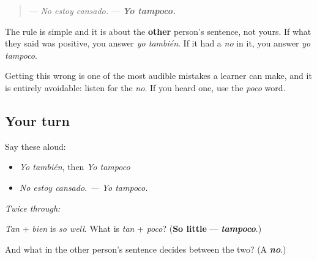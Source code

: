 \begin{culture}
\begin{quote}
— \emph{No estoy cansado.} — \emph{\textbf{Yo tampoco.}}
\end{quote}

The rule is simple and it is about the \textbf{other} person's sentence, not yours. If what they said was positive, you answer \emph{yo también}. If it had a \emph{no} in it, you answer \emph{yo tampoco}.

Getting this wrong is one of the most audible mistakes a learner can make, and it is entirely avoidable: listen for the \emph{no}. If you heard one, use the \emph{poco} word.
\end{culture}

\subsection*{Your turn}
Say these aloud:

\begin{itemize}
\raggedright
  \item \emph{Yo también}, then \emph{Yo tampoco}
  \item \emph{No estoy cansado. — Yo tampoco.}
\end{itemize}

\emph{Twice through:}

\begin{tcolorbox}[breakable,colback=teal!4,colframe=teal!35!black,title={Before you move on}]
\emph{Tan} + \emph{bien} is \emph{so well}. What is \emph{tan} + \emph{poco}? (\textbf{So little} — \emph{\textbf{tampoco}}.)

And what in the other person's sentence decides between the two? (A \emph{\textbf{no}}.)
\end{tcolorbox}
